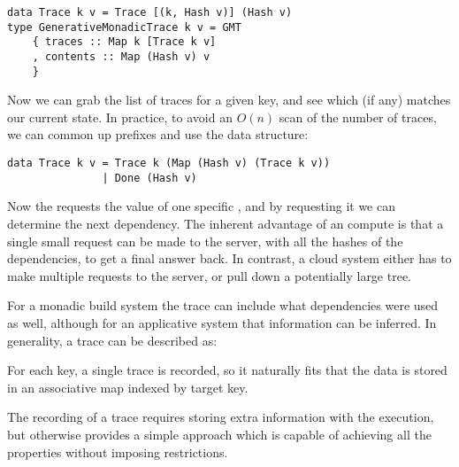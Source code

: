 \begin{verbatim}
data Trace k v = Trace [(k, Hash v)] (Hash v)
type GenerativeMonadicTrace k v = GMT
    { traces :: Map k [Trace k v]
    , contents :: Map (Hash v) v
    }
\end{verbatim}

Now we can grab the list of traces for a given key, and see which (if any) matches our current state. In practice, to avoid an $O(n)$ scan of the number of traces, we can common up prefixes and use the data structure:

\begin{verbatim}
data Trace k v = Trace k (Map (Hash v) (Trace k v))
               | Done (Hash v)
\end{verbatim}

Now the  requests the value of one specific , and by requesting it we can determine the next dependency. The inherent advantage of an  compute is that a single small request can be made to the server, with all the hashes of the dependencies, to get a final answer back. In contrast, a  cloud system either has to make multiple requests to the server, or pull down a potentially large  tree.




 For a monadic build system the trace can include what dependencies were used as well, although for an applicative system that information can be inferred. In generality, a trace can be described as:



For each key, a single trace is recorded, so it naturally fits that the data is stored in an associative map indexed by target key.

The recording of a trace requires storing extra information with the execution, but otherwise provides a simple approach which is capable of achieving all the properties without imposing restrictions.
